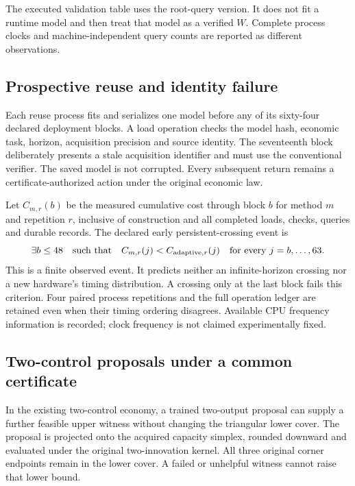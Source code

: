 The executed validation table uses the root-query version. It does not fit a runtime model and then treat that model as a verified $W$. Complete process clocks and machine-independent query counts are reported as different observations.

\subsection{Prospective reuse and identity failure}
Each reuse process fits and serializes one model before any of its sixty-four declared deployment blocks. A load operation checks the model hash, economic task, horizon, acquisition precision and source identity. The seventeenth block deliberately presents a stale acquisition identifier and must use the conventional verifier. The saved model is not corrupted. Every subsequent return remains a certificate-authorized action under the original economic law.

Let $C_{m,r}(b)$ be the measured cumulative cost through block $b$ for method $m$ and repetition $r$, inclusive of construction and all completed loads, checks, queries and durable records. The declared early persistent-crossing event is
\[
 \exists b\le48\quad\text{such that}\quad
 C_{m,r}(j)<C_{{\rm adaptive},r}(j)\quad
 \text{for every }j=b,\ldots,63.
\]
This is a finite observed event. It predicts neither an infinite-horizon crossing nor a new hardware's timing distribution. A crossing only at the last block fails this criterion. Four paired process repetitions and the full operation ledger are retained even when their timing ordering disagrees. Available CPU frequency information is recorded; clock frequency is not claimed experimentally fixed.

\subsection{Two-control proposals under a common certificate}
In the existing two-control economy, a trained two-output proposal can supply a further feasible upper witness without changing the triangular lower cover. The proposal is projected onto the acquired capacity simplex, rounded downward and evaluated under the original two-innovation kernel. All three original corner endpoints remain in the lower cover. A failed or unhelpful witness cannot raise that lower bound.

